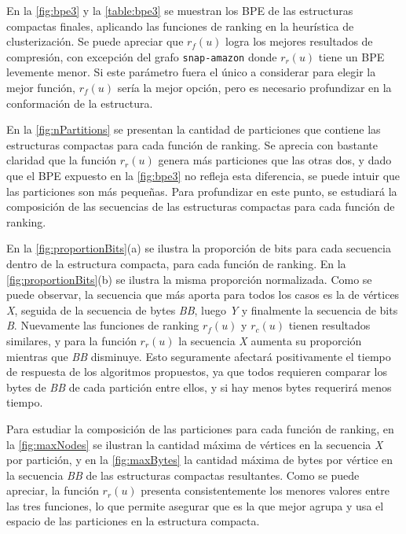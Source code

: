 En la \autoref{fig:bpe3} y la \autoref{table:bpe3} se muestran los BPE de las estructuras compactas finales, aplicando las funciones de ranking en la heurística de clusterización. Se puede apreciar que $r_{f}(u)$ logra los mejores resultados de compresión, con excepción del grafo \texttt{snap-amazon} donde $r_{r}(u)$ tiene un BPE levemente menor. Si este parámetro fuera el único a considerar para elegir la mejor función, $r_{f}(u)$ sería la mejor opción, pero es necesario profundizar en la conformación de la estructura.




En la \autoref{fig:nPartitions} se presentan la cantidad de particiones que contiene las estructuras compactas para cada función de ranking. Se aprecia con bastante claridad que la función $r_{r}(u)$ genera más particiones que las otras dos, y dado que el BPE expuesto en la \autoref{fig:bpe3} no refleja esta diferencia, se puede intuir que las particiones son más pequeñas. Para profundizar en este punto, se estudiará la composición de las secuencias de las estructuras compactas para cada función de ranking.



En la \autoref{fig:proportionBits}(a) se ilustra la proporción de bits para cada secuencia dentro de la estructura compacta, para cada función de ranking. En la \autoref{fig:proportionBits}(b) se ilustra la misma proporción normalizada. Como se puede observar, la secuencia que más aporta para todos los casos es la de vértices \textit{X}, seguida de la secuencia de bytes \textit{BB}, luego \textit{Y} y finalmente la secuencia de bits \textit{B}. Nuevamente las funciones de ranking $r_{f}(u)$ y $r_{c}(u)$ tienen resultados similares, y para la función $r_{r}(u)$ la secuencia \textit{X} aumenta su proporción mientras que \textit{BB} disminuye. Esto seguramente afectará positivamente el tiempo de respuesta de los algoritmos propuestos, ya que todos requieren comparar los bytes de \textit{BB} de cada partición entre ellos, y si hay menos bytes requerirá menos tiempo.



Para estudiar la composición de las particiones para cada función de ranking, en la \autoref{fig:maxNodes} se ilustran la cantidad máxima de vértices en la secuencia \textit{X} por partición, y en la \autoref{fig:maxBytes} la cantidad máxima de bytes por vértice en la secuencia \textit{BB} de las estructuras compactas resultantes. Como se puede apreciar, la función $r_{r}(u)$ presenta consistentemente los menores valores entre las tres funciones, lo que permite asegurar que es la que mejor agrupa y usa el espacio de las particiones en la estructura compacta.

